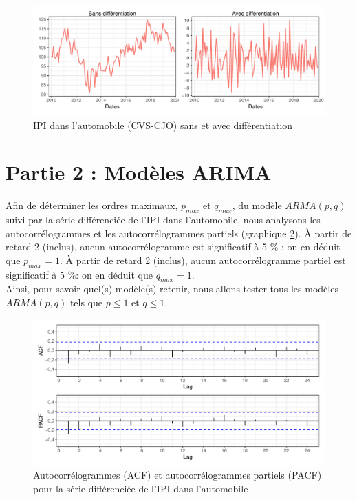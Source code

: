 \documentclass[]{article}
\begin{document}
\begin{figure}

{\centering \includegraphics{img/rmd-compGraph-1} 

}

\caption{IPI dans l'automobile (CVS-CJO) sans et avec différentiation}\label{fig:compGraph}
\end{figure}

\hypertarget{partie-2-moduxe8les-arima}{%
\section{Partie 2 : Modèles ARIMA}\label{partie-2-moduxe8les-arima}}

Afin de déterminer les ordres maximaux, \(p_{max}\) et \(q_{max}\), du modèle \(ARMA(p,q)\) suivi par la série différenciée de l'IPI dans l'automobile, nous analysons les autocorrélogrammes et les autocorrélogrammes partiels (graphique \ref{fig:acfPacf}).
À partir de retard 2 (inclus), aucun autocorrélogramme est significatif à 5 \% : on en déduit que \(p_{max} = 1\).
À partir de retard 2 (inclus), aucun autocorrélogramme partiel est significatif à 5 \%: on en déduit que \(q_{max} = 1\).\\
Ainsi, pour savoir quel(s) modèle(s) retenir, nous allons tester tous les modèles \(ARMA(p,q)\) tels que \(p\leq 1\) et \(q\leq 1\).

\begin{figure}

{\centering \includegraphics{img/rmd-acfPacf-1} 

}

\caption{Autocorrélogrammes (ACF) et autocorrélogrammes partiels (PACF) pour la série différenciée de l'IPI dans l'automobile}\label{fig:acfPacf}
\end{figure}
\end{document}
